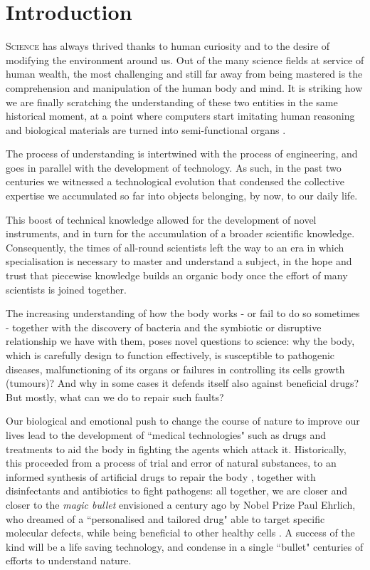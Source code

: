 \chapter{Introduction} \label{chapter:intro}

\lettrine{S}{cience} has always thrived thanks to human curiosity and to the desire of modifying the environment around us.
%
Out of the many science fields at service of human wealth, the most challenging and still far away from being mastered is the comprehension and manipulation of the human body and mind. It is striking how we are finally scratching the understanding of these two entities in the same historical moment, at a point where computers start imitating human reasoning \citep{AlphaGo,googleAIblog,Alom2019} and biological materials are turned into semi-functional organs \citep{Rossi2018}.

The process of understanding is intertwined with the process of engineering, and goes in parallel with the development of technology. As such, in the past two centuries we witnessed a technological evolution that condensed the collective expertise we accumulated so far into objects belonging, by now, to our daily life.

This boost of technical knowledge allowed for the development of novel instruments, and in turn for the accumulation of a broader scientific knowledge. Consequently, the times of all-round scientists left the way to an era in which specialisation is necessary to master and understand a subject, in the hope and trust that piecewise knowledge builds an organic body once the effort of many scientists is joined together.

The increasing understanding of how the body works - or fail to do so sometimes - together with the discovery of bacteria and the symbiotic or disruptive relationship we have with them, poses novel questions to science: why the body, which is carefully design to function effectively, is susceptible to pathogenic diseases, malfunctioning of its organs or failures in controlling its cells growth (tumours)? And why in some cases it defends itself also against beneficial drugs? But mostly, what can we do to repair such faults?

Our biological and emotional push to change the course of nature to improve our lives lead to the development of ``medical technologies" such as drugs and treatments to aid the body in fighting the agents which attack it. Historically, this proceeded from a process of trial and error of natural substances, to an informed synthesis of artificial drugs to repair the body \citep{Wishart2018}, together with disinfectants \citep{WIDES_database} and antibiotics \citep{ABXdatabaseJhopkins} to fight pathogens: all together, we are closer and closer to the \emph{magic bullet} envisioned a century ago by Nobel Prize Paul Ehrlich, who dreamed of a ``personalised and tailored drug" able to target specific molecular defects, while being beneficial to other healthy cells \citep{Strebhardt2008}. A success of the kind will be a life saving technology, and condense in a single ``bullet" centuries of efforts to understand nature.


